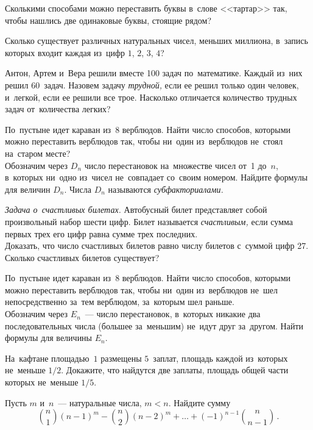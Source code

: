 \begin{problems}

\item
Сколькими способами можно переставить буквы в~слове <<тартар>> так, чтобы
нашлись две одинаковые буквы, стоящие рядом?

\item
Сколько существует различных натуральных чисел, меньших миллиона, в~запись
которых входит каждая из~цифр $1$, $2$, $3$, $4$?

\item
Антон, Артем и~Вера решили вместе 100 задач по~математике.
Каждый из~них решил 60~задач.
Назовем задачу \emph{трудной,} если ее решил только один человек, и~легкой,
если ее решили все трое.
Насколько отличается количество трудных задач от~количества легких?

\item
\subproblem
По~пустыне идет караван из~8 верблюдов.
Найти число способов, которыми можно переставить верблюдов так, чтобы ни~один
из~верблюдов не~стоял на~старом месте?
\\
\subproblem
Обозначим через $D_{n}$ число перестановок на~множестве чисел от~1 до~$n$,
в~которых ни~одно из~чисел не~совпадает со~своим номером.
Найдите формулы для величин $D_{n}$.
Числа $D_{n}$ называются \emph{субфакториалами.}

\item\emph{Задача о~счастливых билетах.}
Автобусный билет представляет собой произвольный набор шести цифр.
Билет называется \emph{счастливым,} если сумма первых трех его цифр равна сумме
трех последних.
\\
\subproblem
Доказать, что число счастливых билетов равно числу билетов с~суммой цифр 27.
\\
\subproblem
Сколько счастливых билетов существует?

\item
\subproblem
По~пустыне идет караван из~8 верблюдов.
Найти число способов, которыми можно переставить верблюдов так, чтобы ни~один
из~верблюдов не~шел непосредственно за~тем верблюдом, за~которым шел раньше.
\\
\subproblem
Обозначим через $E_{n}$~--- число перестановок, в~которых никакие два
последовательных числа (большее за~меньшим) не~идут друг за~другом.
Найти формулы для величины $E_{n}$.

\item
На~кафтане площадью~$1$ размещены $5$~заплат, площадь каждой из~которых
не~меньше $1/2$.
Докажите, что найдутся две заплаты, площадь общей части которых
не~меньше $1/5$.

\item
Пусть $m$ и~$n$~--- натуральные числа, $m < n$.
Найдите сумму
\[
    \binom{n}{1} (n - 1)^{m}
    - \binom{n}{2}(n-2)^{m}
    + \ldots +
    (-1)^{n-1} \binom{n}{n-1}
\, . \]

\end{problems}

\endgroup %

